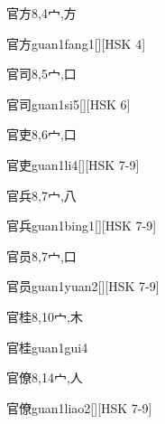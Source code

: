 \begin{Entry}{官方}{8,4}{⼧,⽅}
  \begin{Phonetics}{官方}{guan1fang1}[][HSK 4]
  \end{Phonetics}
\end{Entry}

\begin{Entry}{官司}{8,5}{⼧,⼝}
  \begin{Phonetics}{官司}{guan1si5}[][HSK 6]
  \end{Phonetics}
\end{Entry}

\begin{Entry}{官吏}{8,6}{⼧,⼝}
  \begin{Phonetics}{官吏}{guan1li4}[][HSK 7-9]
  \end{Phonetics}
\end{Entry}

\begin{Entry}{官兵}{8,7}{⼧,⼋}
  \begin{Phonetics}{官兵}{guan1bing1}[][HSK 7-9]
  \end{Phonetics}
\end{Entry}

\begin{Entry}{官员}{8,7}{⼧,⼝}
  \begin{Phonetics}{官员}{guan1yuan2}[][HSK 7-9]
  \end{Phonetics}
\end{Entry}

\begin{Entry}{官桂}{8,10}{⼧,⽊}
  \begin{Phonetics}{官桂}{guan1gui4}
  \end{Phonetics}
\end{Entry}

\begin{Entry}{官僚}{8,14}{⼧,⼈}
  \begin{Phonetics}{官僚}{guan1liao2}[][HSK 7-9]
  \end{Phonetics}
\end{Entry}

